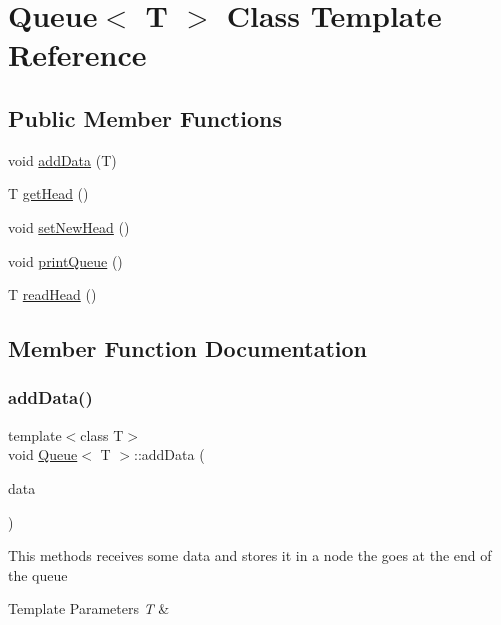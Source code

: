 \hypertarget{class_queue}{}\section{Queue$<$ T $>$ Class Template Reference}
\label{class_queue}
\subsection*{Public Member Functions}
\begin{DoxyCompactItemize}
\item 
void \mbox{\hyperlink{class_queue_ad6155396e35d8bc6054e8ea3dd9f327b}{add\+Data}} (T)
\item 
T \mbox{\hyperlink{class_queue_ab5e1528ddf791c4b1e72082b2fedb540}{get\+Head}} ()
\item 
void \mbox{\hyperlink{class_queue_accadcc0fafa61d585ea8a5d8d0e276a7}{set\+New\+Head}} ()
\item 
void \mbox{\hyperlink{class_queue_adb7623e0e38d05b7de1bf6f812a26c3f}{print\+Queue}} ()
\item 
T \mbox{\hyperlink{class_queue_a30ecd50a120ac43c94a85629d172f560}{read\+Head}} ()
\end{DoxyCompactItemize}


\subsection{Member Function Documentation}
\mbox{\label{class_queue_ad6155396e35d8bc6054e8ea3dd9f327b}} 
\subsubsection{\texorpdfstring{addData()}{addData()}}
{\footnotesize\ttfamily template$<$class T$>$ \\
void \mbox{\hyperlink{class_queue}{Queue}}$<$ T $>$\+::add\+Data (\begin{DoxyParamCaption}\item[{T}]{data }\end{DoxyParamCaption})}

This methods receives some data and stores it in a node the goes at the end of the queue 
\begin{DoxyTemplParams}{Template Parameters}
{\em T} & \\
\hline
\end{DoxyTemplParams}

